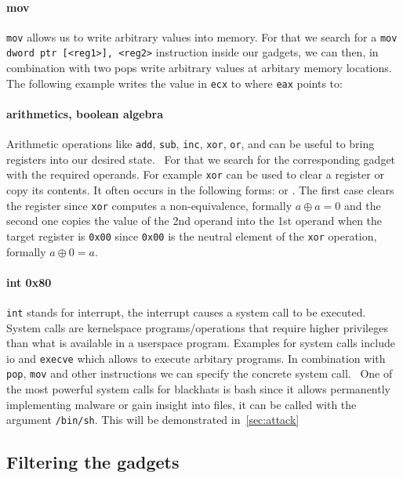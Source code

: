 \documentclass[journal=tosc,submission, notanonymous]{iacrtrans}
\begin{document}
\paragraph{mov}
\Verb+mov+ allows us to write arbitrary values into memory. For that we search for a \Verb+mov dword ptr [<reg1>], <reg2>+ instruction inside our gadgets, we can then, in combination with two pops write arbitrary values at arbitary memory locations.~\cite{ropsla} The following example writes the value in \Verb+ecx+ to where \Verb+eax+ points to: 
\paragraph{arithmetics, boolean algebra}
Arithmetic operations like \Verb+add+, \Verb+sub+, \Verb+inc+, \Verb+xor+, \Verb+or+, and can be useful to bring registers into our desired state.~\cite{ropsla} For that we search for the corresponding gadget with the required operands. For example \Verb+xor+ can be used to clear a register or copy its contents. It often occurs in the following forms:  or . The first case clears the register since \Verb+xor+ computes a non-equivalence, formally $a \oplus a = 0$ and the second one copies the value of the 2nd operand into the 1st operand when the target register is \Verb+0x00+ since \Verb+0x00+ is the neutral element of the \Verb+xor+ operation, formally $a \oplus 0 = a$.
\paragraph{int 0x80}
\Verb+int+ stands for interrupt, the interrupt  causes a system call to be executed. System calls are kernelspace programs/operations that require higher privileges than what is available in a userspace program. Examples for system calls include io and \Verb+execve+ which allows to execute arbitary programs. In combination with \Verb+pop+, \Verb+mov+ and other instructions we can specify the concrete system call.~\cite{ropsla} One of the most powerful system calls for blackhats is bash since it allows permanently implementing malware or gain insight into files, it can be called with the argument \Verb+/bin/sh+. This will be demonstrated in~\cref{sec:attack}
\subsection{Filtering the gadgets}
\label{subsec:filtering}
\end{document}
